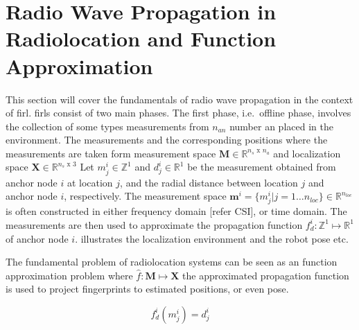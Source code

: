 \section{Radio Wave Propagation in Radiolocation and Function Approximation}
\label{sec:fundamentals}
    This section will cover the fundamentals of radio wave propagation in the context of \gls{firl}.
    \Gls{firl}s consist of two main phases.
    The first phase, i.e.\ offline phase, involves the collection of some types measurements from $n_{an}$ number \gls{an} placed in the environment.
    The measurements and the corresponding positions where the measurements are taken form measurement space $\bm{M} \in \mathbb{R}^{n_{s} \text{ x } n_{a}}$ and localization space $\bm{X} \in \mathbb{R}^{n_{s} \text{ x } 3}$
    Let $m^i_j \in \mathbb{Z}^1$ and $d^i_j \in \mathbb{R}^1$ be the measurement obtained from anchor node $i$ at  location $j$, and the radial distance between location $j$ and anchor node $i$, respectively.
    The measurement space $\bm{m}^i=\{m^i_j | j=1 \ldots n_{loc}\} \in \mathbb{R}^{n_{loc}}$ is often constructed in either frequency domain [refer CSI], or time domain.
    The measurements are then used to approximate the propagation function $f^i_d:\mathbb{Z}^1\mapsto\mathbb{R}^1$ of anchor node $i$.
     illustrates the localization environment and the robot pose etc.

    The fundamental problem of radiolocation systems can be seen as an function approximation problem where $\hat{f}: \bm{M} \mapsto \bm{X}$ the approximated propagation function is used to project fingerprints to estimated positions, or even pose.


    \begin{equation}
        f^i_d(m^i_j)=d^i_j
    \end{equation}

